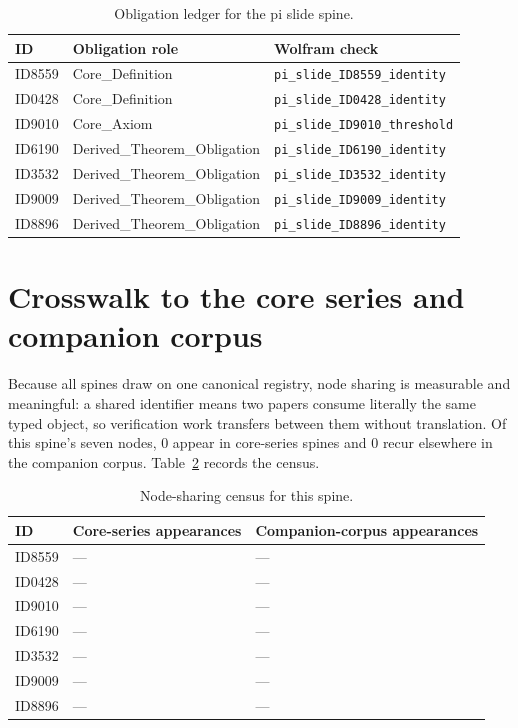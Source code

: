 \documentclass[11pt]{article}
\theoremstyle{remark}
\begin{document}
\begin{table}[ht]
\centering
\small
\caption{Obligation ledger for the pi slide spine.}
\label{tab:obligations}
\begin{tabular}{llp{6.2cm}}
\toprule
ID & Obligation role & Wolfram check \\
\midrule
ID8559 & Core\_Definition & \texttt{pi\_slide\_ID8559\_identity} \\
ID0428 & Core\_Definition & \texttt{pi\_slide\_ID0428\_identity} \\
ID9010 & Core\_Axiom & \texttt{pi\_slide\_ID9010\_threshold} \\
ID6190 & Derived\_Theorem\_Obligation & \texttt{pi\_slide\_ID6190\_identity} \\
ID3532 & Derived\_Theorem\_Obligation & \texttt{pi\_slide\_ID3532\_identity} \\
ID9009 & Derived\_Theorem\_Obligation & \texttt{pi\_slide\_ID9009\_identity} \\
ID8896 & Derived\_Theorem\_Obligation & \texttt{pi\_slide\_ID8896\_identity} \\
\bottomrule
\end{tabular}
\end{table}

\section{Crosswalk to the core series and companion corpus}
\label{sec:crosswalk}

Because all spines draw on one canonical registry, node sharing is measurable and meaningful: a shared identifier means two papers consume literally the same typed object, so verification work transfers between them without translation. Of this spine's seven nodes, 0 appear in core-series spines and 0 recur elsewhere in the companion corpus. Table~\ref{tab:crosswalk} records the census.

\begin{table}[ht]
\centering
\small
\caption{Node-sharing census for this spine.}
\label{tab:crosswalk}
\begin{tabular}{lp{4.4cm}p{6.6cm}}
\toprule
ID & Core-series appearances & Companion-corpus appearances \\
\midrule
ID8559 & --- & --- \\
ID0428 & --- & --- \\
ID9010 & --- & --- \\
ID6190 & --- & --- \\
ID3532 & --- & --- \\
ID9009 & --- & --- \\
ID8896 & --- & --- \\
\bottomrule
\end{tabular}
\end{table}
\end{document}
